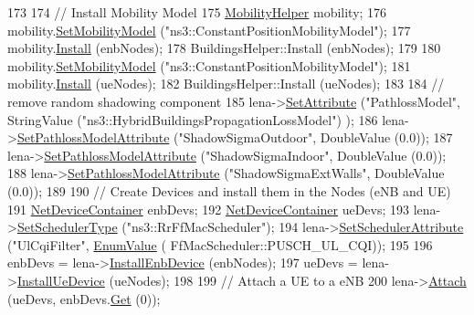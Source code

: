 \begin{DoxyCode}
173 
174   \textcolor{comment}{// Install Mobility Model}
175   \hyperlink{classns3_1_1MobilityHelper}{MobilityHelper} mobility;
176   mobility.\hyperlink{classns3_1_1MobilityHelper_a030275011b6f40682e70534d30280aba}{SetMobilityModel} (\textcolor{stringliteral}{"ns3::ConstantPositionMobilityModel"});
177   mobility.\hyperlink{classns3_1_1MobilityHelper_a07737960ee95c0777109cf2994dd97ae}{Install} (enbNodes);
178   BuildingsHelper::Install (enbNodes);
179   
180   mobility.\hyperlink{classns3_1_1MobilityHelper_a030275011b6f40682e70534d30280aba}{SetMobilityModel} (\textcolor{stringliteral}{"ns3::ConstantPositionMobilityModel"});
181   mobility.\hyperlink{classns3_1_1MobilityHelper_a07737960ee95c0777109cf2994dd97ae}{Install} (ueNodes);
182   BuildingsHelper::Install (ueNodes);
183 
184   \textcolor{comment}{// remove random shadowing component}
185   lena->\hyperlink{classns3_1_1ObjectBase_ac60245d3ea4123bbc9b1d391f1f6592f}{SetAttribute} (\textcolor{stringliteral}{"PathlossModel"}, StringValue (\textcolor{stringliteral}{"ns3::HybridBuildingsPropagationLossModel"})
      );
186   lena->\hyperlink{classns3_1_1LteHelper_aa96ebbd6845ca61c2b5e08e84481a348}{SetPathlossModelAttribute} (\textcolor{stringliteral}{"ShadowSigmaOutdoor"}, DoubleValue (0.0));
187   lena->\hyperlink{classns3_1_1LteHelper_aa96ebbd6845ca61c2b5e08e84481a348}{SetPathlossModelAttribute} (\textcolor{stringliteral}{"ShadowSigmaIndoor"}, DoubleValue (0.0));
188   lena->\hyperlink{classns3_1_1LteHelper_aa96ebbd6845ca61c2b5e08e84481a348}{SetPathlossModelAttribute} (\textcolor{stringliteral}{"ShadowSigmaExtWalls"}, DoubleValue (0.0));
189 
190   \textcolor{comment}{// Create Devices and install them in the Nodes (eNB and UE)}
191   \hyperlink{classns3_1_1NetDeviceContainer}{NetDeviceContainer} enbDevs;
192   \hyperlink{classns3_1_1NetDeviceContainer}{NetDeviceContainer} ueDevs;
193   lena->\hyperlink{classns3_1_1LteHelper_a8f86e55b8b80a81732c4b2df00fb25d5}{SetSchedulerType} (\textcolor{stringliteral}{"ns3::RrFfMacScheduler"});
194   lena->\hyperlink{classns3_1_1LteHelper_a38f8c7f4592b31c0f3dedb53e7909742}{SetSchedulerAttribute} (\textcolor{stringliteral}{"UlCqiFilter"}, \hyperlink{classns3_1_1EnumValue}{EnumValue} (
      FfMacScheduler::PUSCH\_UL\_CQI));
195 
196   enbDevs = lena->\hyperlink{classns3_1_1LteHelper_a5e009ad35ef85f46b5a6099263f15a03}{InstallEnbDevice} (enbNodes);
197   ueDevs = lena->\hyperlink{classns3_1_1LteHelper_ac9cd932d7de92811cfa953c2e3b2fc9f}{InstallUeDevice} (ueNodes);
198 
199   \textcolor{comment}{// Attach a UE to a eNB}
200   lena->\hyperlink{classns3_1_1LteHelper_a9466743f826aa2652a87907b7f0a1c87}{Attach} (ueDevs, enbDevs.\hyperlink{classns3_1_1NetDeviceContainer_a677d62594b5c9d2dea155cc5045f4d0b}{Get} (0));

\end{DoxyCode}

